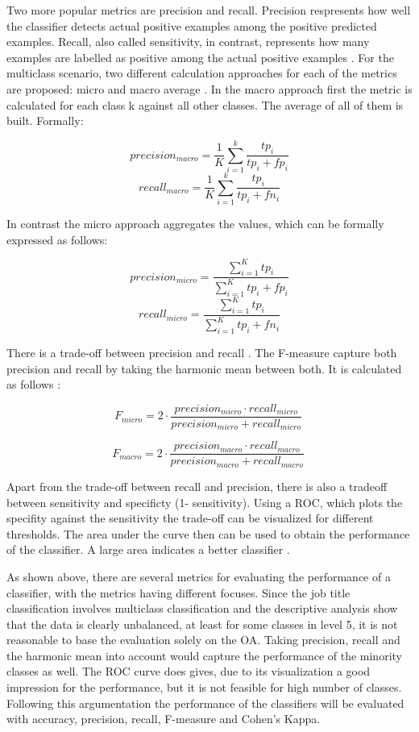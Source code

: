 \documentclass[12pt, a4paper, titlepage]{article}
\begin{document}
Two more popular metrics are precision and recall. Precision respresents how well the classifier detects actual positive examples among the positive predicted examples. Recall, also called sensitivity, in contrast, represents how many examples are labelled as positive among the actual positive examples \citep{Berthold2020}. For the multiclass scenario, two different calculation approaches for each of the metrics are proposed: micro and macro average \citep{Branco2017}. In the macro approach first the metric is calculated for each class k against all other classes. The average of all of them is built. Formally: 

\[precision_{macro} = \frac{1}{K} \sum_{i=1}^k \frac{tp_{i}}{tp_{i} + fp_{i}}\]
\[recall_{macro} = \frac{1}{K} \sum_{i=1}^k \frac{tp_{i}}{tp_{i} + fn_{i}}\]

In contrast the micro approach aggregates the values, which can be formally expressed as follows: 

\[precision_{micro} = \frac{\sum_{i=1}^K tp_i}{\sum_{i=1}^K tp_i + fp_i}\]
\[recall_{micro} = \frac{\sum_{i=1}^K tp_i}{\sum_{i=1}^K tp_i + fn_i}\]

There is a trade-off between precision and recall \citep{Buckland1994}. The F-measure capture both precision and recall by taking the harmonic mean between both. It is calculated as follows \citep{Branco2017,Pan2016}:  

\[F_{micro} = 2 \cdot \frac{precision_{micro} \cdot recall_{micro} }{precision_{micro} + recall_{micro} }\ \]

\[F_{macro} = 2 \cdot \frac{precision_{macro} \cdot recall_{macro} }{precision_{macro} + recall_{macro} }\ \]

Apart from the trade-off between recall and precision, there is also a tradeoff between sensitivity and specificty (1- sensitivity). Using a \ac{ROC}, which plots the specifity against the sensitivity the trade-off can be visualized for different thresholds. The area under the curve then can be used to obtain the performance of the classifier. A large area indicates a better classifier \citep{Berthold2020, Espindola2005}. 

As shown above, there are several metrics for evaluating the performance of a classifier, with the metrics having different focuses. Since the job title classification involves multiclass classification and the descriptive analysis show that the data is clearly unbalanced, at least for some classes in level 5, it is not reasonable to base the evaluation solely on the \ac{OA}. Taking precision, recall and the harmonic mean into account would capture the performance of the minority classes as well. The \ac{ROC} curve does gives, due to its visualization a good impression for the performance, but it is not feasible for high number of classes. Following this argumentation the performance of the classifiers will be evaluated with accuracy, precision, recall, F-measure and Cohen's Kappa. 
\end{document}
